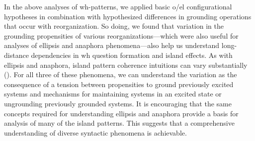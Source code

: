 In the above analyses of wh-patterns, we applied basic o/el configurational hypotheses in combination with hypothesized differences in grounding operations that occur with reorganization. So doing, we found that variation in the grounding propensities of various reorganizations—which were also useful for analyses of ellipsis and anaphora phenomena—also help us understand long-distance dependencies in wh question formation and island effects. As with ellipsis and anaphora, island pattern coherence intuitions can vary substantially (\citealt{Kluender1998,SprouseHornstein2013,SprouseEtAl2012}). For all three of these phenomena, we can understand the variation as the consequence of a tension between propensities to ground previously excited systems and mechanisms for maintaining systems in an excited state or ungrounding previously grounded systems. It is encouraging that the same concepts required for understanding ellipsis and anaphora provide a basis for analysis of many of the island patterns. This suggests that a comprehensive understanding of diverse syntactic phenomena is achievable.

